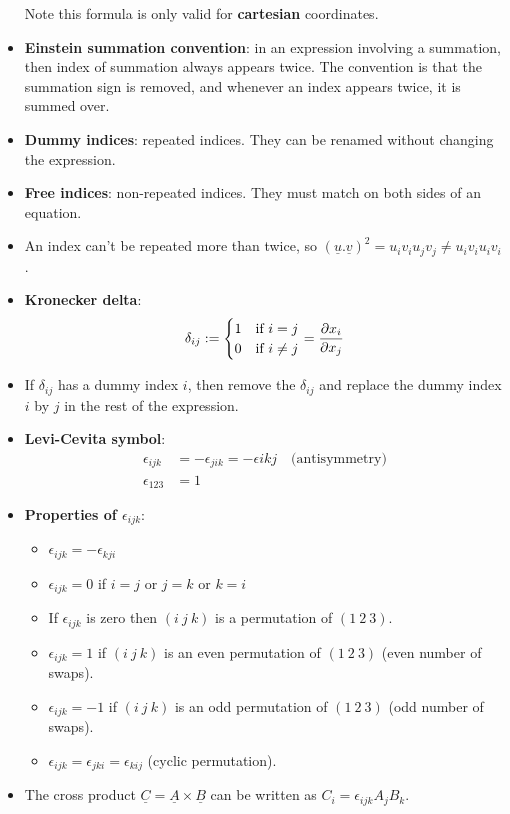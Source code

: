 \begin{itemize}
\[	\]
	Note this formula is only valid for \textbf{cartesian} coordinates.
	\item \textbf{Einstein summation convention}: in an expression involving a summation, then index of summation always appears twice. The convention is that the summation sign is removed, and whenever an index appears twice, it is summed over.
	\item \textbf{Dummy indices}: repeated indices. They can be renamed without changing the expression.
	\item \textbf{Free indices}: non-repeated indices. They must match on both sides of an equation.
	\item An index can't be repeated more than twice, so $(\underline{u} . \underline{v})^2 = u_i v_i u_j v_j \ne u_i v_i u_i v_i$.
	\item \textbf{Kronecker delta}:
	\[
		\delta_{ij} := \begin{cases}
			1 & \text{if } i = j \\
			0 & \text{if } i \ne j
		\end{cases} = \diffp{x_i}{x_j}
	\]
	\item If $\delta_{ij}$ has a dummy index $i$, then remove the $\delta_{ij}$ and replace the dummy index $i$ by $j$ in the rest of the expression.
	\item \textbf{Levi-Cevita symbol}:
	\[
		\begin{aligned}
			\epsilon_{ijk} & = -\epsilon_{jik} = -\epsilon{ikj} \quad \text{(antisymmetry)} \\
			\epsilon_{123} & = 1
		\end{aligned}
	\]
	\item \textbf{Properties of $\epsilon_{ijk}$}:
	\begin{itemize}
		\item $\epsilon_{ijk} = -\epsilon_{kji}$
		\item $\epsilon_{ijk} = 0$ if $i = j$ or $j = k$ or $k = i$
		\item If $\epsilon_{ijk}$ is zero then $(i \ j \ k)$ is a permutation of $(1 \ 2 \ 3)$.
		\item $\epsilon_{ijk} = 1$ if $(i \ j \ k)$ is an even permutation of $(1 \ 2 \ 3)$ (even number of swaps).
		\item $\epsilon_{ijk} = -1$ if $(i \ j \ k)$ is an odd permutation of $(1 \ 2 \ 3)$ (odd number of swaps).
		\item $\epsilon_{ijk} = \epsilon_{jki} = \epsilon_{kij}$ (cyclic permutation).
	\end{itemize}
	\item The cross product $\underline{C} = \underline{A} \times \underline{B}$ can be written as $C_i = \epsilon_{ijk} A_j B_k$.

\end{itemize}

